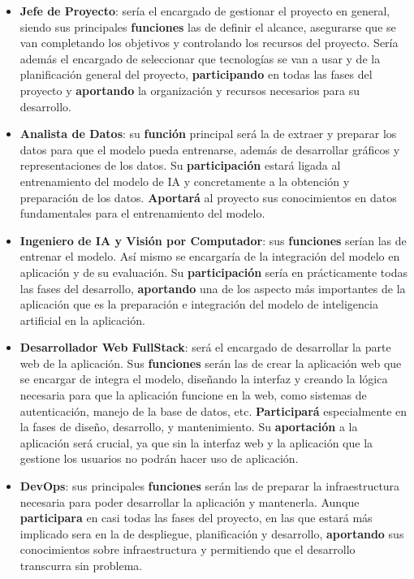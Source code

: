\begin{itemize}
	\item \textbf{Jefe de Proyecto}: sería el encargado de gestionar el proyecto en general, siendo sus principales \textbf{funciones} las de definir el alcance, asegurarse que se van completando los objetivos y controlando los recursos del proyecto. Sería además el encargado de seleccionar que tecnologías se van a usar y de la planificación general del proyecto, \textbf{participando} en todas las fases del proyecto y \textbf{aportando} la organización y recursos necesarios para su desarrollo.
	
	\item \textbf{Analista de Datos}: su \textbf{función} principal será la de extraer y preparar los datos para que el modelo pueda entrenarse, además de desarrollar gráficos y representaciones de los datos. Su \textbf{participación} estará ligada al entrenamiento del modelo de IA y concretamente a la obtención y preparación de los datos. \textbf{Aportará} al proyecto sus conocimientos en datos fundamentales para el entrenamiento del modelo.
	
	\item \textbf{Ingeniero de IA y Visión por Computador}: sus \textbf{funciones} serían las de entrenar el modelo. Así mismo se encargaría de la integración del modelo en aplicación y de su evaluación. Su \textbf{participación} sería en prácticamente todas las fases del desarrollo, \textbf{aportando} una de los aspecto más importantes de la aplicación que es la preparación e integración del modelo de inteligencia artificial en la aplicación.
	
	\item \textbf{Desarrollador Web FullStack}: será el encargado de desarrollar la parte web de la aplicación. Sus \textbf{funciones} serán las de crear la aplicación web que se encargar de integra el modelo, diseñando la interfaz y creando la lógica necesaria para que la aplicación funcione en la web, como sistemas de autenticación, manejo de la base de datos, etc. \textbf{Participará} especialmente en la fases de diseño, desarrollo, y mantenimiento. Su \textbf{aportación} a la aplicación será crucial, ya que sin la interfaz web y la aplicación que la gestione los usuarios no podrán hacer uso de aplicación.
	
	\item \textbf{DevOps}: sus principales \textbf{funciones} serán las de preparar la infraestructura necesaria para poder desarrollar la aplicación y mantenerla. Aunque \textbf{participara} en casi todas las fases del proyecto, en las que estará más implicado sera en la de despliegue, planificación y desarrollo, \textbf{aportando} sus conocimientos sobre infraestructura y permitiendo que el desarrollo transcurra sin problema.
	

\end{itemize}
